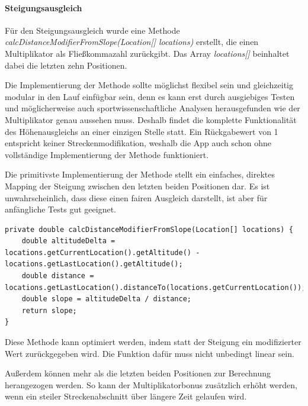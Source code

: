 \paragraph{Steigungsausgleich}
Für den Steigungsausgleich wurde eine Methode  \textit{calcDistanceModifierFromSlope(Location[] locations)} erstellt, die einen Multiplikator als Fließkommazahl zurückgibt. Das Array \textit{locations[]} beinhaltet dabei die letzten zehn Positionen.

Die Implementierung der Methode sollte möglichst flexibel sein und gleichzeitig modular in den Lauf einfügbar sein, denn es kann erst durch ausgiebiges Testen und möglicherweise auch sportwissenschaftliche Analysen herausgefunden wie der Multiplikator genau aussehen muss. Deshalb findet die komplette Funktionalität des Höhenausgleichs an einer einzigen Stelle statt. Ein Rückgabewert von 1 entspricht keiner Streckenmodifikation, weshalb die App auch schon ohne vollständige Implementierung der Methode funktioniert.

Die primitivste Implementierung der Methode stellt ein einfaches, direktes Mapping der Steigung zwischen den letzten beiden Positionen dar. Es ist unwahrscheinlich, dass diese einen fairen Ausgleich darstellt, ist aber für anfängliche Tests gut geeignet.
\lstset{language=java}
\begin{lstlisting}[frame=htrbl, caption={Primitive Implementierung der Methode}, breaklines=true]
private double calcDistanceModifierFromSlope(Location[] locations) {
	double altitudeDelta = locations.getCurrentLocation().getAltitude() - locations.getLastLocation().getAltitude();
	double distance = locations.getLastLocation().distanceTo(locations.getCurrentLocation());
	double slope = altitudeDelta / distance;
	return slope;
}
\end{lstlisting}

Diese Methode kann optimiert werden, indem statt der Steigung ein modifizierter Wert zurückgegeben wird. Die Funktion dafür muss nicht unbedingt linear sein.

Außerdem können mehr als die letzten beiden Positionen zur Berechnung herangezogen werden. So kann der Multiplikatorbonus zusätzlich erhöht werden, wenn ein steiler Streckenabschnitt über längere Zeit gelaufen wird.